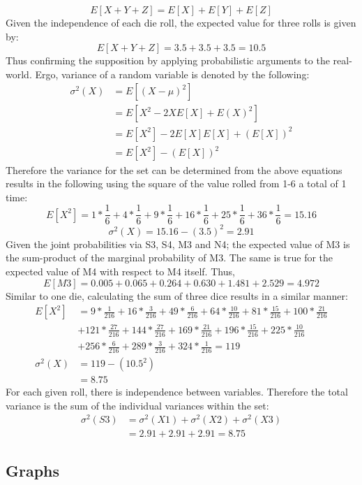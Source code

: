 \documentclass[12pt]{article}
\begin{document}
$$E[X+Y+Z]=E[X]+E[Y]+E[Z]$$
Given the independence of each die roll, the expected value for three rolls is given by:
$$E[X+Y+Z]=3.5+3.5+3.5=10.5$$
Thus confirming the supposition by applying probabilistic arguments to the real-world. Ergo, variance of a random variable is denoted by the following:
\begin{align*}
\sigma^2(X)&=E[(X-\mu)^2]\\
&=E[X^2-2XE[X]+E(X)^2]\\
&=E[X^2]-2E[X]E[X]+(E[X])^2\\
&=E[X^2]-(E[X])^2
\end{align*}
Therefore the variance for the set can be determined from the above equations results in the following using the square of the value rolled from 1-6 a total of 1 time:
$$E[X^2]=1*\frac{1}{6}+4*\frac{1}{6}+9*\frac{1}{6}+16*\frac{1}{6}+25*\frac{1}{6}+36*\frac{1}{6}=15.16$$
$$\sigma^2(X)=15.16-(3.5)^2=2.91$$
Given the joint probabilities via S3, S4, M3 and N4; the expected value of M3 is the sum-product of the marginal probability of M3. The same is true for the expected value of M4 with respect to M4 itself. Thus,
$$E[M3]=0.005+0.065+0.264+0.630+1.481+2.529=4.972$$
Similar to one die, calculating the sum of three dice results in a similar manner:
\begin{align*}
E[X^2]&=9*\frac{1}{216}+16*\frac{3}{216}+49*\frac{6}{216}+64*\frac{10}{216}+81*\frac{15}{216}+100*\frac{21}{216}\\&+121*\frac{27}{216}+144*\frac{27}{216}+169*\frac{21}{216}+196*\frac{15}{216}+225*\frac{10}{216}\\&+256*\frac{6}{216}+289*\frac{3}{216}+324*\frac{1}{216} = 119\\
\sigma^2(X)&=119-(10.5^2)\\
&=8.75
\end{align*}
For each given roll, there is independence between variables. Therefore the total variance is the sum of the individual variances within the set:
\begin{align*}
\sigma^2(S3)&=\sigma^2(X1)+\sigma^2(X2)+\sigma^2(X3)\\
&=2.91+2.91+2.91=8.75
\end{align*}

\subsection{Graphs}
\end{document}
